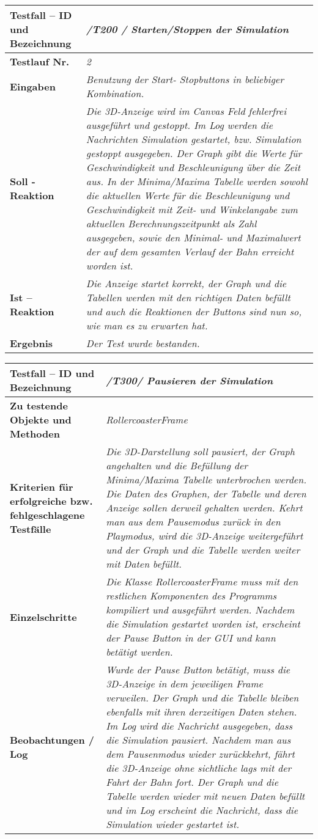 \begin{longtable}{|p{7cm}|p{10cm}|}
\hline
\textbf{Testfall -- ID und Bezeichnung} & \textit{ /T200 / Starten/Stoppen der Simulation} \\
\hline
\textbf{Testlauf Nr.} & \textit{2} \\
\hline
\textbf{Eingaben} & \textit{Benutzung der Start- Stopbuttons in beliebiger Kombination.} \\
\hline
\textbf{Soll - Reaktion} & \textit{Die 3D-Anzeige wird im Canvas Feld fehlerfrei ausgeführt und gestoppt. Im Log werden die Nachrichten Simulation gestartet, bzw. Simulation gestoppt ausgegeben.
Der Graph gibt die Werte für Geschwindigkeit und Beschleunigung über die Zeit aus. In der Minima/Maxima Tabelle werden sowohl die aktuellen Werte für die Beschleunigung und Geschwindigkeit mit 
Zeit- und Winkelangabe zum aktuellen Berechnungszeitpunkt als Zahl ausgegeben, sowie den Minimal- und Maximalwert der auf dem gesamten Verlauf der Bahn erreicht worden ist.
} \\
\hline
\textbf{Ist -- Reaktion} & \textit{Die Anzeige startet korrekt, der Graph und die Tabellen werden mit den richtigen Daten befüllt und auch die Reaktionen der Buttons sind nun so, wie man es zu
erwarten hat.} \\
\hline
\textbf{Ergebnis} & \textit{Der Test wurde bestanden.} \\
\hline
\end{longtable}

\begin{longtable}{|p{7cm}|p{10cm}|}
\hline
\textbf{Testfall -- ID und Bezeichnung} &  \textit{/T300/ Pausieren der Simulation} \\
\hline
\textbf{Zu testende Objekte und Methoden} &  \textit{RollercoasterFrame}
\\
\hline
\textbf{Kriterien für erfolgreiche bzw. fehlgeschlagene Testfälle} &
\textit{Die 3D-Darstellung soll pausiert, der Graph angehalten und die Befüllung der Minima/Maxima Tabelle unterbrochen werden. Die Daten des Graphen, der Tabelle und deren Anzeige sollen
derweil gehalten werden. Kehrt man aus dem Pausemodus zurück in den Playmodus, wird die 3D-Anzeige weitergeführt und der Graph und die Tabelle werden weiter mit Daten befüllt.} \\
\hline
\textbf{Einzelschritte} &  \textit{Die Klasse RollercoasterFrame muss mit den restlichen Komponenten des Programms kompiliert und ausgeführt werden. Nachdem die Simulation gestartet worden ist,
erscheint der Pause Button in der GUI und kann betätigt werden.} \\
\hline
\textbf{Beobachtungen / Log} &  \textit{Wurde der Pause Button betätigt, muss die 3D-Anzeige in dem jeweiligen Frame verweilen. Der Graph und die Tabelle bleiben ebenfalls mit ihren derzeitigen
Daten stehen. Im Log wird die Nachricht ausgegeben, dass die Simulation pausiert. Nachdem man aus dem Pausenmodus wieder zurückkehrt, fährt die 3D-Anzeige ohne sichtliche lags mit der Fahrt 
der Bahn fort. Der Graph und die Tabelle werden wieder mit neuen Daten befüllt und im Log erscheint die Nachricht, dass die Simulation wieder gestartet ist. } \\
\hline
\end{longtable}

